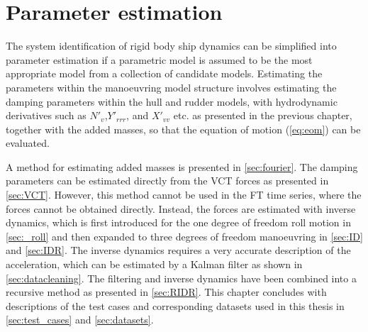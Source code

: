 \chapter{Parameter estimation}\label{ch:methods}
\noindent The system identification of rigid body ship dynamics can be simplified into parameter estimation if a parametric model is assumed to be the most appropriate model from a collection of candidate models. Estimating the parameters within the manoeuvring model structure involves estimating the damping parameters within the hull and rudder models, with hydrodynamic derivatives such as $N'_v$,$Y'_{rrr}$, and $X'_{vv}$ etc. as presented in the previous chapter, together with the added masses, so that the equation of motion (\autoref{eq:eom}) can be evaluated.

A method for estimating added masses is presented in \autoref{sec:fourier}. The damping parameters can be estimated directly from the VCT forces as presented in \autoref{sec:VCT}. However, this method cannot be used in the FT time series, where the forces cannot be obtained directly. Instead, the forces are estimated with inverse dynamics, which is first introduced for the one degree of freedom roll motion in \autoref{sec:_roll} and then expanded to three degrees of freedom manoeuvring in \autoref{sec:ID} and \autoref{sec:IDR}. The inverse dynamics requires a very accurate description of the acceleration, which can be estimated by a Kalman filter as shown in \autoref{sec:datacleaning}. The filtering and inverse dynamics have been combined into a recursive method as presented in \autoref{sec:RIDR}. This chapter concludes with descriptions of the test cases and corresponding datasets used in this thesis in \autoref{sec:test_cases} and \ref{sec:datasets}.

%
%
%
%

